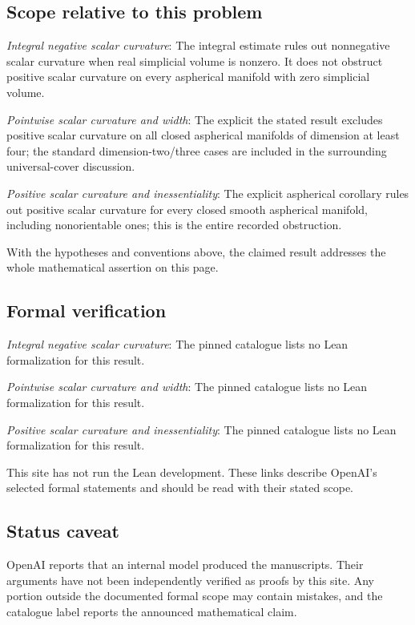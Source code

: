 \documentclass[11pt]{article}
\begin{document}
\subsection{Scope relative to this problem}
\textit{Integral negative scalar curvature}: The integral estimate rules out nonnegative scalar curvature when real simplicial volume is nonzero. It does not obstruct positive scalar curvature on every aspherical manifold with zero simplicial volume.

\textit{Pointwise scalar curvature and width}: The explicit the stated result excludes positive scalar curvature on all closed aspherical manifolds of dimension at least four; the standard dimension-two/three cases are included in the surrounding universal-cover discussion.

\textit{Positive scalar curvature and inessentiality}: The explicit aspherical corollary rules out positive scalar curvature for every closed smooth aspherical manifold, including nonorientable ones; this is the entire recorded obstruction.

With the hypotheses and conventions above, the claimed result addresses the whole mathematical assertion on this page.

\subsection{Formal verification}
\textit{Integral negative scalar curvature}: The pinned catalogue lists no Lean formalization for this result.

\textit{Pointwise scalar curvature and width}: The pinned catalogue lists no Lean formalization for this result.

\textit{Positive scalar curvature and inessentiality}: The pinned catalogue lists no Lean formalization for this result.

This site has not run the Lean development. These links describe OpenAI’s selected formal statements and should be read with their stated scope.

\subsection{Status caveat}
OpenAI reports that an internal model produced the manuscripts. Their arguments have not been independently verified as proofs by this site. Any portion outside the documented formal scope may contain mistakes, and the catalogue label reports the announced mathematical claim.
\end{document}
